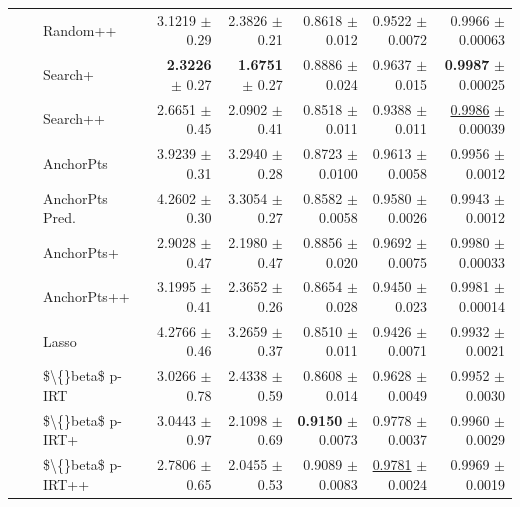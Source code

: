 \begin{longtable}{llp{}rrrrr}
 &  & Random++ & 3.1219 {\scriptsize $\pm$ 0.29} & 2.3826 {\scriptsize $\pm$ 0.21} & 0.8618 {\scriptsize $\pm$ 0.012} & 0.9522 {\scriptsize $\pm$ 0.0072} & 0.9966 {\scriptsize $\pm$ 0.00063} \\
 &  & Search+ & \textbf{2.3226} {\scriptsize $\pm$ 0.27} & \textbf{1.6751} {\scriptsize $\pm$ 0.27} & 0.8886 {\scriptsize $\pm$ 0.024} & 0.9637 {\scriptsize $\pm$ 0.015} & \textbf{0.9987} {\scriptsize $\pm$ 0.00025} \\
 &  & Search++ & 2.6651 {\scriptsize $\pm$ 0.45} & 2.0902 {\scriptsize $\pm$ 0.41} & 0.8518 {\scriptsize $\pm$ 0.011} & 0.9388 {\scriptsize $\pm$ 0.011} & \underline{0.9986} {\scriptsize $\pm$ 0.00039} \\
 &  & AnchorPts & 3.9239 {\scriptsize $\pm$ 0.31} & 3.2940 {\scriptsize $\pm$ 0.28} & 0.8723 {\scriptsize $\pm$ 0.0100} & 0.9613 {\scriptsize $\pm$ 0.0058} & 0.9956 {\scriptsize $\pm$ 0.0012} \\
 &  & AnchorPts Pred. & 4.2602 {\scriptsize $\pm$ 0.30} & 3.3054 {\scriptsize $\pm$ 0.27} & 0.8582 {\scriptsize $\pm$ 0.0058} & 0.9580 {\scriptsize $\pm$ 0.0026} & 0.9943 {\scriptsize $\pm$ 0.0012} \\
 &  & AnchorPts+ & 2.9028 {\scriptsize $\pm$ 0.47} & 2.1980 {\scriptsize $\pm$ 0.47} & 0.8856 {\scriptsize $\pm$ 0.020} & 0.9692 {\scriptsize $\pm$ 0.0075} & 0.9980 {\scriptsize $\pm$ 0.00033} \\
 &  & AnchorPts++ & 3.1995 {\scriptsize $\pm$ 0.41} & 2.3652 {\scriptsize $\pm$ 0.26} & 0.8654 {\scriptsize $\pm$ 0.028} & 0.9450 {\scriptsize $\pm$ 0.023} & 0.9981 {\scriptsize $\pm$ 0.00014} \\
 &  & Lasso & 4.2766 {\scriptsize $\pm$ 0.46} & 3.2659 {\scriptsize $\pm$ 0.37} & 0.8510 {\scriptsize $\pm$ 0.011} & 0.9426 {\scriptsize $\pm$ 0.0071} & 0.9932 {\scriptsize $\pm$ 0.0021} \\
 &  & \$\textbackslash\{\}beta\$ p-IRT & 3.0266 {\scriptsize $\pm$ 0.78} & 2.4338 {\scriptsize $\pm$ 0.59} & 0.8608 {\scriptsize $\pm$ 0.014} & 0.9628 {\scriptsize $\pm$ 0.0049} & 0.9952 {\scriptsize $\pm$ 0.0030} \\
 &  & \$\textbackslash\{\}beta\$ p-IRT+ & 3.0443 {\scriptsize $\pm$ 0.97} & 2.1098 {\scriptsize $\pm$ 0.69} & \textbf{0.9150} {\scriptsize $\pm$ 0.0073} & 0.9778 {\scriptsize $\pm$ 0.0037} & 0.9960 {\scriptsize $\pm$ 0.0029} \\
 &  & \$\textbackslash\{\}beta\$ p-IRT++ & 2.7806 {\scriptsize $\pm$ 0.65} & 2.0455 {\scriptsize $\pm$ 0.53} & 0.9089 {\scriptsize $\pm$ 0.0083} & \underline{0.9781} {\scriptsize $\pm$ 0.0024} & 0.9969 {\scriptsize $\pm$ 0.0019} \\

\end{longtable}
